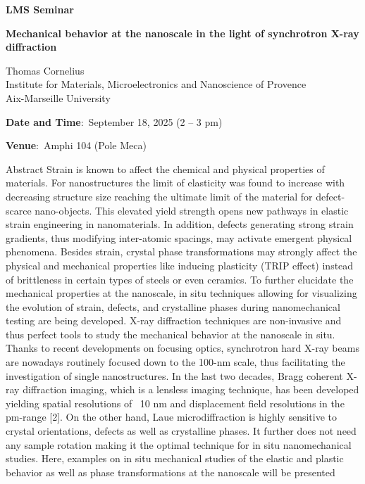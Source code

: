 \documentclass[a4paper,12pt,fleqn]{article}
\begin{document}
	\sffamily
\thispagestyle{titlepage}
\vspace*{-3em}
\begin{center}
	\huge \textbf{LMS Seminar}
\end{center}
\begin{center}
	\Large 
	\textbf{Mechanical behavior at the nanoscale in the light of synchrotron X-ray diffraction} 
\end{center}
\begin{center}
	\Large
	Thomas Cornelius \\
	{\large Institute for Materials, Microelectronics and Nanoscience of Provence \\ 
	Aix-Marseille University} \\
	\vspace*{1em}
	{\Large
	\textbf{Date and Time}:~September 18, 2025 (2 -- 3 pm)
	
	\textbf{Venue}:~Amphi 104 (Pole Meca) }
\end{center}
\vspace*{-1em}
\begin{myhlbox}{{\large Abstract}}
	Strain is known to affect the chemical and physical properties of materials. For nanostructures the limit of elasticity was found to increase with decreasing structure size reaching the ultimate limit of the material for defect-scarce nano-objects. This elevated yield strength opens new pathways in elastic strain engineering in nanomaterials. In addition, defects generating strong strain gradients, thus modifying inter-atomic spacings, may activate emergent physical phenomena. Besides strain, crystal phase transformations may strongly affect the physical and mechanical properties like inducing plasticity (TRIP effect) instead of brittleness in certain types of steels or even ceramics. To further elucidate the mechanical properties at the nanoscale, in situ techniques allowing for visualizing the evolution of strain, defects, and crystalline phases during nanomechanical testing are being developed.
	X-ray diffraction techniques are non-invasive and thus perfect tools to study the mechanical behavior at the nanoscale in situ. Thanks to recent developments on focusing optics, synchrotron hard X-ray beams are nowadays routinely focused down to the 100-nm scale, thus facilitating the investigation of single nanostructures. In the last two decades, Bragg coherent X-ray diffraction imaging, which is a lensless imaging technique, has been developed yielding spatial resolutions of ~10 nm and displacement field resolutions in the pm-range [2]. On the other hand, Laue microdiffraction is highly sensitive to crystal orientations, defects as well as crystalline phases. It further does not need any sample rotation making it the optimal technique for in situ nanomechanical studies.
	Here, examples on in situ mechanical studies of the elastic and plastic behavior as well as phase transformations at the nanoscale will be presented 
	
\end{myhlbox}
\end{document}
